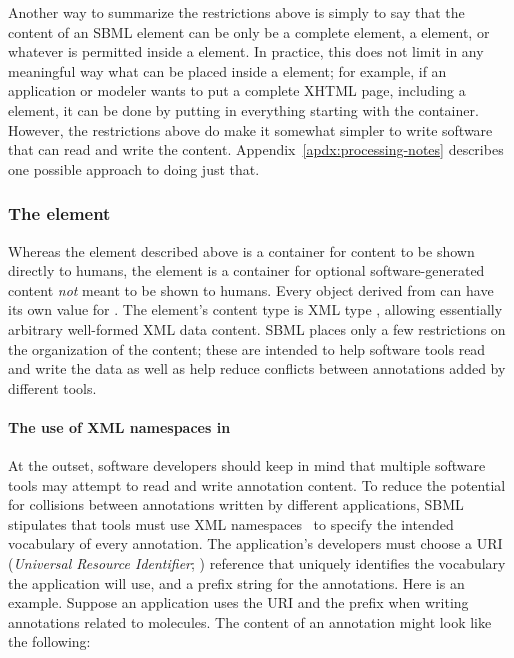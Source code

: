 Another way to summarize the restrictions above is simply to say
that the content of an SBML  element can be only be a
complete  element, a  element, or whatever
is permitted inside a  element.  In practice, this
does not limit in any meaningful way what can be placed inside a
 element; for example, if an application or modeler
wants to put a complete XHTML page, including a 
element, it can be done by putting in everything starting with the
 container.  However, the restrictions above do make
it somewhat simpler to write software that can read and write the
 content.  Appendix~\ref{apdx:processing-notes}
describes one possible approach to doing just that.


\subsubsection{The  element}
\label{sec:annotation-use}
\label{sec:annotations}

Whereas the  element described above is a container for
content to be shown directly to humans, the 
element is a container for optional software-generated content
\emph{not} meant to be shown to humans.  Every object derived
from \SBase can have its own value for .  The
element's content type is XML type , allowing essentially
arbitrary well-formed XML data content.  SBML places only a few restrictions on
the organization of the content; these are intended to help
software tools read and write the data as well as help reduce
conflicts between annotations added by different tools.


\paragraph{The use of XML namespaces in }


At the outset, software developers should keep in mind that
multiple software tools may attempt to read and write annotation
content.  To reduce the potential for collisions between
annotations written by different applications, SBML \thisLV
stipulates that tools must use XML namespaces~\citep{bray:1999} to
specify the intended vocabulary of every annotation.  The
application's developers must choose a URI (\emph{Universal
  Resource Identifier}; \citealt{harold:2001,w3c:2000}) reference
that uniquely identifies the vocabulary the application will use,
and a prefix string for the annotations.  Here is an example.
Suppose an application uses the URI 
and the prefix  when writing annotations related to 
molecules.  The content of an annotation might look like the
following:

